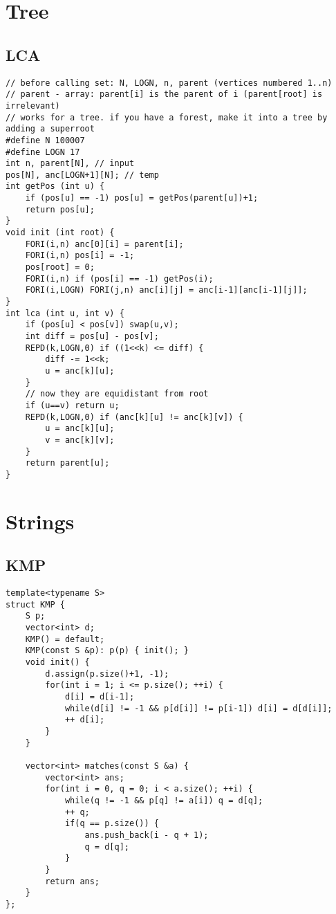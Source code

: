 \documentclass[a4paper,9pt]{article}
\begin{document}
\section{Tree}

\subsection{LCA}

\begin{lstlisting}
// before calling set: N, LOGN, n, parent (vertices numbered 1..n)
// parent - array: parent[i] is the parent of i (parent[root] is irrelevant)
// works for a tree. if you have a forest, make it into a tree by adding a superroot
#define N 100007
#define LOGN 17
int n, parent[N], // input
pos[N], anc[LOGN+1][N]; // temp
int getPos (int u) {
	if (pos[u] == -1) pos[u] = getPos(parent[u])+1;
	return pos[u];
}
void init (int root) {
	FORI(i,n) anc[0][i] = parent[i];
	FORI(i,n) pos[i] = -1;
	pos[root] = 0;
	FORI(i,n) if (pos[i] == -1) getPos(i);
	FORI(i,LOGN) FORI(j,n) anc[i][j] = anc[i-1][anc[i-1][j]];
}
int lca (int u, int v) {
	if (pos[u] < pos[v]) swap(u,v);
	int diff = pos[u] - pos[v];
	REPD(k,LOGN,0) if ((1<<k) <= diff) {
		diff -= 1<<k;
		u = anc[k][u];
	}
	// now they are equidistant from root
	if (u==v) return u;
	REPD(k,LOGN,0) if (anc[k][u] != anc[k][v]) {
		u = anc[k][u];
		v = anc[k][v];
	}
	return parent[u];
}
\end{lstlisting}

\section{Strings}

\subsection{KMP}

\begin{lstlisting}
template<typename S>
struct KMP {
	S p;
	vector<int> d;
	KMP() = default;
	KMP(const S &p): p(p) { init(); }
	void init() {
		d.assign(p.size()+1, -1);
		for(int i = 1; i <= p.size(); ++i) {
			d[i] = d[i-1];
			while(d[i] != -1 && p[d[i]] != p[i-1]) d[i] = d[d[i]];
			++ d[i];
		}
	}
	
	vector<int> matches(const S &a) {
		vector<int> ans;
		for(int i = 0, q = 0; i < a.size(); ++i) {
			while(q != -1 && p[q] != a[i]) q = d[q];
			++ q;
			if(q == p.size()) {
				ans.push_back(i - q + 1);
				q = d[q];
			}
		}
		return ans;
	}
};
\end{lstlisting}
\end{document}
